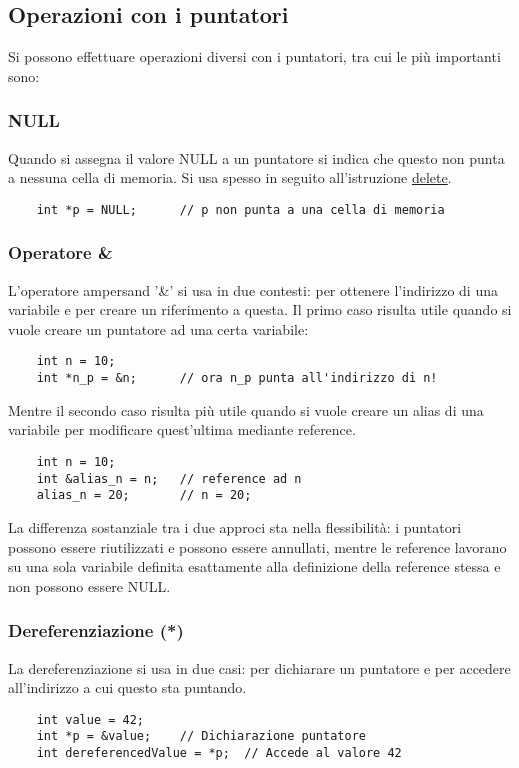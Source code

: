 \documentclass[12pt]{article}
\begin{document}
\subsection{Operazioni con i puntatori}
\label{ssec:puntatori_operazioni}
Si possono effettuare operazioni diversi con i puntatori, tra cui le più importanti sono:

\subsubsection{NULL}
\label{sssec:NULL_operator}
Quando si assegna il valore NULL a un puntatore si indica che questo non punta a nessuna cella di memoria. Si usa spesso in seguito all'istruzione \hyperref[sssec:delete_operator]{delete}.
\begin{lstlisting}
    int *p = NULL;      // p non punta a una cella di memoria
\end{lstlisting}

\subsubsection{Operatore \&}
\label{sssec:ampersand_operator}
L'operatore ampersand '\&' si usa in due contesti: per ottenere l'indirizzo di una variabile e per creare un riferimento a questa.
Il primo caso risulta utile quando si vuole creare un puntatore ad una certa variabile:
\begin{lstlisting}
    int n = 10;
    int *n_p = &n;      // ora n_p punta all'indirizzo di n!
\end{lstlisting}
Mentre il secondo caso risulta più utile quando si vuole creare un alias di una variabile per modificare quest'ultima mediante reference.
\begin{lstlisting}
    int n = 10;
    int &alias_n = n;   // reference ad n
    alias_n = 20;       // n = 20;
\end{lstlisting}
La differenza sostanziale tra i due approci sta nella flessibilità: i puntatori possono essere riutilizzati e possono essere annullati, mentre le reference lavorano su una sola variabile definita esattamente alla definizione della reference stessa e non possono essere NULL.

\subsubsection{Dereferenziazione (*)}
\label{sssec:dereferenziazione}
La dereferenziazione si usa in due casi: per dichiarare un puntatore e per accedere all'indirizzo a cui questo sta puntando.
\begin{lstlisting}
    int value = 42;
    int *p = &value;    // Dichiarazione puntatore
    int dereferencedValue = *p;  // Accede al valore 42
\end{lstlisting}
\end{document}
